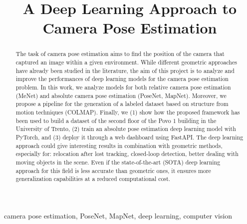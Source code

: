 \documentclass[conference]{IEEEtran}
\begin{document}
\title{A Deep Learning Approach to Camera Pose Estimation}

\author{
\and
{}
}

\maketitle

\thispagestyle{plain}
\pagestyle{plain}

\begin{abstract}
The task of camera pose estimation aims to find the position of the camera that captured an image within a given environment.
While different geometric approaches have already been studied in the literature, the aim of this project is to analyze and improve the performances of deep learning models for the camera pose estimation problem.
In this work, we analyze models for both relative camera pose estimation (MeNet) and absolute camera pose estimation (PoseNet, MapNet). Moreover, we propose a pipeline for the generation of a labeled dataset based on structure from motion techniques (COLMAP).
Finally, we (1) show how the proposed framework has been used to build a dataset of the second floor of the Povo 1 building in the University of Trento, (2) train an absolute pose estimation deep learning model with PyTorch, and (3) deploy it through a web dashboard using FastAPI.
The deep learning approach could give interesting results in combination with geometric methods, especially for: relocation after lost tracking, closed-loop detection, better dealing with moving objects in the scene. Even if the state-of-the-art (SOTA) deep learning approach for this field is less accurate than geometric ones, it ensures more generalization capabilities at a reduced  computational cost.
\end{abstract}

\begin{IEEEkeywords}
camera pose estimation, PoseNet, MapNet, deep learning, computer vision
\end{IEEEkeywords}









{}

\end{document}
